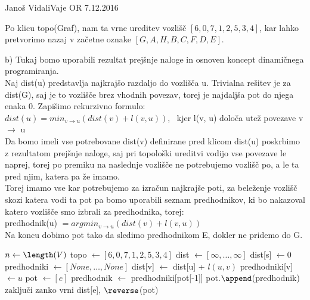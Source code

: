 \begin{naloga}{Janoš Vidali}{Vaje OR 7.12.2016}
\begin{odgovor}
\noindent Po klicu topo(Graf), nam ta vrne ureditev vozlišč $[6, 0, 7, 1, 2, 5, 3, 4]$, 
kar lahko pretvorimo nazaj v začetne oznake $[G, A, H, B, C, F, D, E]$. \pagebreak

\noindent b) Tukaj bomo uporabili rezultat prejšnje naloge in osnoven 
koncept dinamičnega programiranja.\\

\noindent Naj dist(u) predstavlja najkrajšo razdaljo do vozlišča u.
Trivialna rešitev je za dist(G), saj je to vozlišče brez vhodnih povezav, torej je najdaljša pot do njega
enaka 0. Zapišimo rekurzivno formulo: \\
$dist(u) = min_{v \rightarrow u}(dist(v) + l(v, u))$, \
kjer l(v, u) določa utež povezave v $\rightarrow$ u \\

\noindent Da bomo imeli vse potrebovane dist(v) definirane pred klicom dist(u) 
poskrbimo z rezultatom prejšnje naloge, saj pri topološki ureditvi vodijo vse povezave le naprej, 
torej po premiku na naslednje vozlišče ne potrebujemo vozlišč po, a le ta pred njim,
katera pa že imamo.\\

\noindent Torej imamo vse kar potrebujemo za izračun najkrajše poti, 
za beleženje vozlišč skozi katera vodi ta pot pa bomo uporabili seznam predhodnikov, 
ki bo nakazoval katero vozlišče smo izbrali za predhodnika, torej: \\
predhodnik(u) $= argmin_{v \rightarrow u}(dist(v) + l(v, u))$ \\
Na koncu dobimo pot tako da sledimo predhodnikom E, dokler ne pridemo do G.  \\

\begin{algorithmic}
	\State $n \gets \length(V)$
	\State topo $\gets [6, 0, 7, 1, 2, 5, 3, 4]$
	\State dist $\gets [\infty, \dots, \infty]$
	\State dist[s] $\gets 0$
	\State predhodniki $\gets [None, \dots, None]$
				\State dist[v] $\gets$ dist[u] + $l(u, v)$
				\State predhodniki[v] $\gets u$
			\EndIf
		\EndFor
	\EndFor
	\State pot $\gets [e]$
	\While{\True}
		\State predhodnik $\gets$ predhodniki[pot[-1]]
		\State pot.$\append$(predhodnik)
			\State $\text{zaključi zanko}$
		\EndIf
	\EndWhile
	\State vrni dist[e], $\reverse$(pot)
\EndFunction  \\
\end{algorithmic}


\end{odgovor}
\end{naloga}
